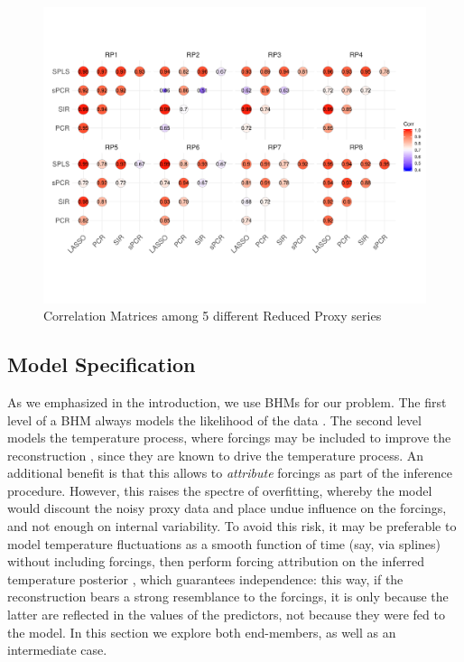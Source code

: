 \documentclass[12pt]{amsart}
\theoremstyle{plain}
\theoremstyle{definition}
\theoremstyle{remark}
\begin{document}
\begin{figure}[h!]
  \vskip -1cm
  \centering
 \includegraphics[scale=0.35]{CorMatrixRPs} 
  \vskip -1.1cm \caption{Correlation Matrices among 5 different Reduced Proxy series}
  \label{fig:CorrRPs}
\end{figure}


\subsection{Model Specification}
\label{sec:modelspec}
As we emphasized in the introduction, we use BHMs for our problem. The first level of a BHM always models the likelihood of the data \citep{Tingley_QSR2012}. The second level models the temperature process, where forcings may be included to improve
the reconstruction \citep{Barboza2014,boli1}, since they are known to drive the
temperature process. An additional benefit is that this allows to {\it
  attribute} forcings \citep[i.e., determine causality,][]{HegerlZwiers:2011} as
part of the inference procedure. However, this raises the spectre of
overfitting, whereby the model would discount the noisy proxy data and place
undue influence on the forcings, and not enough on internal variability. To
avoid this risk, it may be preferable to model temperature fluctuations as a
smooth function of time (say, via splines) without including forcings, then
perform forcing attribution on the inferred temperature posterior
\cite{Schurer2013a, Schurer2013b}, which guarantees independence: this way, if the reconstruction bears a strong resemblance to the forcings, it is only because the latter are reflected in the values of the predictors, not because they were fed to the model. In this section we explore both end-members, as well as an intermediate case. 
\end{document}
